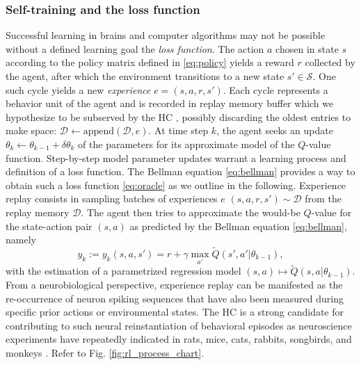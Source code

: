 \documentclass[10pt,letterpaper]{article}
\begin{document}
  \subsubsection{Self-training and the loss function}
  \label{sec:self}
Successful learning in brains and computer algorithms may not be possible without a
defined learning goal \textemdash the \textit{loss function}.
The action $a$ chosen in state $s$ according to the policy matrix defined in
\eqref{eq:policy} yields a reward $r$ collected by the agent,
after which the environment transitions to a new state $s' \in \mathcal S$.
One such cycle yields a new \textit{experience} $e = (s,a,r,s')$.
Each cycle represents a behavior unit of the agent
and is recorded in replay memory buffer \textemdash
which we hypothesize to be subserved by the
HC \textemdash, possibly discarding the oldest entries to make space:
$\mathcal D \leftarrow \text{append}(\mathcal D, e)$.
At time step $k$, the agent seeks an update $\theta_{k} \leftarrow \theta_{k-1}
+ \delta \theta_{k}$ of the parameters for its approximate model of the
$Q$-value function. Step-by-step model parameter updates warrant a learning process and definition of a loss
function. %
The Bellman equation \eqref{eq:bellman} provides a way to obtain such a loss
function \eqref{eq:oracle} as we outline in the following.
Experience replay consists in sampling
batches of experiences $e$
$(s, a, r, s') \sim \mathcal D$ from the replay memory $\mathcal D$.
The agent then tries to approximate
the would-be $Q$-value for the state-action pair $(s,a)$ as predicted by the
Bellman equation \eqref{eq:bellman}, namely
\begin{equation}
  y_k := y_k(s,a,s') =  r + \gamma \max_{a'} \tilde{Q}(s', a'|\theta_{k-1}),
\end{equation}
with the estimation of a parametrized regression model $(s,a)
\mapsto \tilde{Q}(s, a|\theta_{k-1})$.
From a neurobiological perspective, experience replay can be manifested as the
re-occurrence of neuron spiking sequences that have also been measured during
specific prior actions or environmental states. The HC is a strong candidate
for contributing to such neural reinstantiation of behavioral episodes as
neuroscience experiments have repeatedly indicated in rats, mice, cats, rabbits,
songbirds, and monkeys \citep{buhry2011,nokia2010,dave2000,skaggs2007}. Refer to
Fig. \ref{fig:rl_process_chart}.
\end{document}
